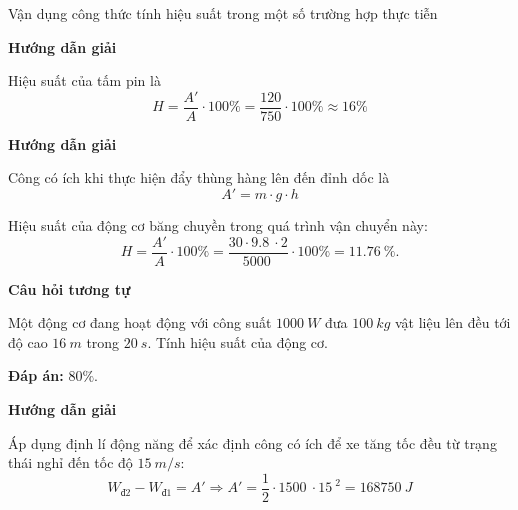 \begin{dang}{Vận dụng công thức tính hiệu suất trong một số trường hợp thực tiễn}
	{	\begin{center}
			\textbf{Hướng dẫn giải}
		\end{center}
		
		Hiệu suất của tấm pin là
		$$H=\dfrac{A'}{A} \cdot 100\% = \dfrac{120}{750} \cdot 100\% \approx 16\%$$
		
		
		
	}
	
	
	
	{	\begin{center}
			\textbf{Hướng dẫn giải}
		\end{center}
		
		Công có ích khi thực hiện đẩy thùng hàng lên đến đỉnh dốc là
		$$A'=m\cdot g \cdot h$$
		
		Hiệu suất của động cơ băng chuyền trong quá trình vận chuyển này:
		$$H=\dfrac{A'}{A} \cdot 100\%  = \dfrac{30 \cdot \SI{9.8}{} \cdot 2}{\SI{5000}{}} \cdot 100\% = \SI{11.76}{\percent}.$$
		
		\begin{center}
			\textbf{Câu hỏi tương tự}
		\end{center}
		
		Một động cơ đang hoạt động với công suất $\SI{1000}{W}$ đưa $\SI{100}{kg}$ vật liệu lên đều tới độ cao $\SI{16}{m}$ trong $\SI{20}{s}$. Tính hiệu suất của động cơ.
		
		\textbf{Đáp án:} $80\%$.
	}
	
	{	\begin{center}
			\textbf{Hướng dẫn giải}
		\end{center}
		
		Áp dụng định lí động năng để xác định công có ích để xe tăng tốc đều từ trạng thái nghỉ đến tốc độ $\SI{15}{m/s}$:
		$$W_\text{đ2} - W_\text{đ1} = A' \Rightarrow A' = \dfrac{1}{2} \cdot \SI{1500}{} \cdot \SI{15}{}^2 = \SI{168750}{J}$$
		
}
\end{dang}
